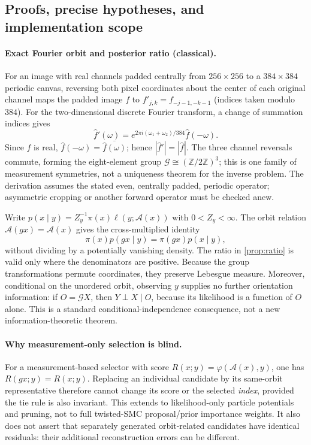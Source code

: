 \subsection{Proofs, precise hypotheses, and implementation scope}
\label{sec:suppl-symmetry-proofs-audit}

\paragraph{Exact Fourier orbit and posterior ratio (classical).}
For an image with real channels padded centrally from $256\times256$
to a $384\times384$ periodic canvas, reversing both pixel coordinates
about the center of each original channel maps the padded image $f$
to $f'_{j,k}=f_{-j-1,-k-1}$ (indices taken modulo $384$).
For the two-dimensional discrete Fourier transform, a change of
summation indices gives
\[
 \widehat f'(\omega)=
 e^{2\pi i(\omega_1+\omega_2)/384}\widehat f(-\omega).
\]
Since $f$ is real, $\widehat f(-\omega)=\overline{\widehat f(\omega)}$;
hence $|\widehat f'|=|\widehat f|$. The three channel reversals
commute, forming the eight-element group
$\mathcal G\cong(\mathbb Z/2\mathbb Z)^3$; this is one family of
measurement symmetries, not a uniqueness theorem for the inverse
problem. The derivation assumes the stated even, centrally padded,
periodic operator; asymmetric cropping or another forward operator
must be checked anew.

Write $p(x\mid y)=Z_y^{-1}\pi(x)\ell(y;\mathcal A(x))$ with
$0<Z_y<\infty$. The orbit relation
$\mathcal A(gx)=\mathcal A(x)$ gives the cross-multiplied identity
\[
 \pi(x)p(gx\mid y)=\pi(gx)p(x\mid y),
\]
without dividing by a potentially vanishing density. The ratio in
\cref{prop:ratio} is valid only where the denominators are positive.
Because the group transformations permute coordinates, they preserve
Lebesgue measure. Moreover, conditional on the unordered orbit,
observing $y$ supplies no further orientation information:
if $O=\mathcal GX$, then $Y\perp X\mid O$, because its likelihood is
a function of $O$ alone. This is a standard conditional-independence
consequence, not a new information-theoretic theorem.

\paragraph{Why measurement-only selection is blind.}
For a measurement-based selector with score
$R(x;y)=\varphi(\mathcal A(x),y)$, one has
$R(gx;y)=R(x;y)$. Replacing an individual candidate by its
same-orbit representative therefore cannot change its score or
the selected \emph{index}, provided the tie rule is also invariant.
This extends to likelihood-only particle potentials and pruning,
not to full twisted-SMC proposal/prior importance weights. It also
does not assert that separately generated orbit-related candidates
have identical residuals: their additional reconstruction errors
can be different.

